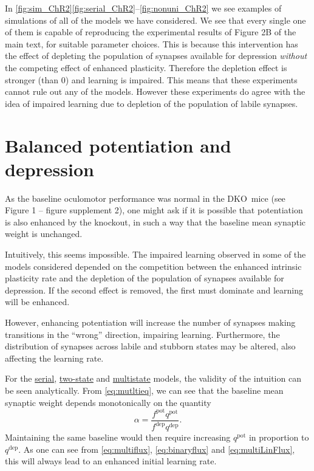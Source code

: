 \documentclass[10pt]{article}
\newcommand{\pot}{^{\text{pot}}}
\newcommand{\dep}{^{\text{dep}}}
\newcommand{\KO}{DKO}
\newcommand{\chrfig}[1][B]{Figure 2#1 of the main text}
\newcommand{\basefig}{Figure 1 -- figure supplement 2}
\begin{document}
In \autoref{fig:sim_ChR2}\ref{fig:serial_ChR2}--\ref{fig:nonuni_ChR2} we see examples of simulations of all of the models we have considered.
We see that every single one of them is capable of reproducing the experimental results of \chrfig, for suitable parameter choices.
This is because this intervention has the effect of depleting the population of synapses available for depression \emph{without} the competing effect of enhanced plasticity.
Therefore the depletion effect is stronger (than 0) and learning is impaired.
This means that these experiments cannot rule out any of the models.
However these experiments do agree with the idea of impaired learning due to depletion of the population of labile synapses.



\section{Balanced potentiation and depression}\label{sec:bal}


As the baseline oculomotor performance was normal in the \KO\ mice (see \basefig), one might ask if it is possible that potentiation is also enhanced by the knockout, in such a way that the baseline mean synaptic weight is unchanged.

Intuitively, this seems impossible.
The impaired learning observed in some of the models considered depended on the competition between the enhanced intrinsic plasticity rate and the depletion of the population of synapses available for depression.
If the second effect is removed, the first must dominate and learning will be enhanced.

However, enhancing potentiation will increase the number of synapses making transitions in the ``wrong'' direction, impairing learning.
Furthermore, the distribution of synapses across labile and stubborn states may be altered, also affecting the learning rate.

For the \hyperref[sec:multistate]{serial}, \hyperref[sec:binary]{two-state} and \hyperref[sec:multistate_lin]{multistate} models, the validity of the intuition can be seen analytically.
From \eqref{eq:mutltieq}, we can see that the baseline mean synaptic weight depends monotonically on the quantity
%
\begin{equation*}
  \alpha=\frac{f\pot q\pot}{f\dep q\dep}.
\end{equation*}
%
Maintaining the same baseline would then require increasing $q\pot$ in proportion to $q\dep$.
As one can see from \eqref{eq:multiflux}, \eqref{eq:binaryflux} and \eqref{eq:multiLinFlux}, this will always lead to an enhanced initial learning rate.
\end{document}
